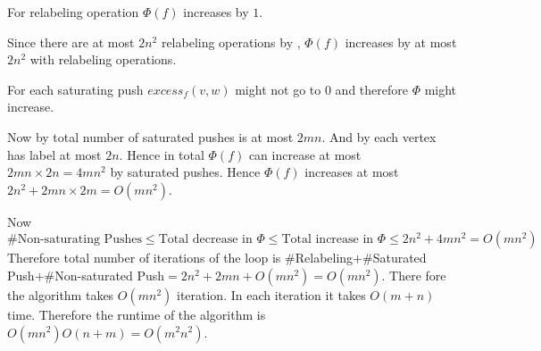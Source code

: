 \begin{observation}
	For relabeling operation $\Phi(f)$ increases by $1$.
\end{observation}
Since there are at most $2n^2$ relabeling operations by  , $\Phi(f)$ increases by at most $2n^2$ with relabeling operations.
\begin{observation}
	For each saturating push $\textit{excess}_f(v,w)$ might not go to $0$ and therefore $\Phi$ might increase.
\end{observation}
Now by  total number of saturated pushes is at most $2mn$. And by  each vertex has label at most $2n$. Hence in total $\Phi(f)$ can increase at most $2mn\times 2n=4mn^2$ by saturated pushes. Hence $\Phi(f)$ increases at most $2n^2+2mn\times 2m=O(mn^2)$.


Now $$\#\text{Non-saturating Pushes}  \leq \text{Total decrease in }\Phi\leq \text{Total increase in }\Phi\leq 2n^2+4mn^2=O(mn^2)$$
Therefore total number of iterations of the  loop is $\#$Relabeling$+\#$Saturated Push$+\#$Non-saturated Push$= 2n^2+2mn+O(mn^2)=O(mn^2)$.  There fore the algorithm takes $O(mn^2)$ iteration. In each iteration it takes $O(m+n)$ time. Therefore the runtime of the algorithm is $O(mn^2)O(n+m)=O(m^2n^2)$. 